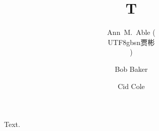 \documentclass{aa}
\begin{document}
\title{T}
\author{
         Ann~M.~Able \inst{\ref{X}} (\begin{CJK*}{UTF8}{gbsn}贾彬\end{CJK*})
    \and Bob Baker \inst{\ref{X},\ref{Y}}
    \and Cid Cole\inst{\ref{Y}}
}
\maketitle
Text.
\end{document}
